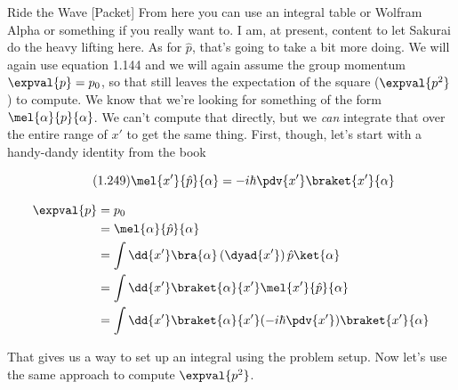 \begin{answer}
\begin{answerpart}{Ride the Wave [Packet]}
    From here you can use an integral table or Wolfram Alpha or
    something if you really want to.  I am, at present, content to let
    Sakurai do the heavy lifting here.  As for $\hat{p}$, that's going
    to take a bit more doing.  We will again use equation 1.144 and we
    will again assume the group momentum $\expval{p} = p_0$, so that
    still leaves the expectation of the square ($\expval{p^2}$) to
    compute.  We know that we're looking for something of the form
    $\mel{\alpha}{p}{\alpha}$.  We can't compute that directly, but we
    \emph{can} integrate that over the entire range of $x'$ to get the
    same thing.  First, though, let's start with a handy-dandy
    identity from the book

    \begin{equation}
      \tag{1.249}
      \mel{x'}{\hat{p}}{\alpha} = -i \hbar \pdv{x'} \braket{x'}{\alpha}
    \end{equation}

    \begin{equation}
      \begin{split}
        \expval{p}
        &= p_0\\
        &= \mel{\alpha}{\hat{p}}{\alpha}\\
        &= \int \dd{x'} \bra{\alpha} \left(\dyad{x'}\right) \hat{p}\ket{\alpha}\\
        &= \int \dd{x'} \braket{\alpha}{x'} \mel{x'}{\hat{p}}{\alpha}\\
        &= \int \dd{x'} \braket{\alpha}{x'} (-i \hbar \pdv{x'})\braket{x'}{\alpha}\\
      \end{split}
    \end{equation}

    That gives us a way to set up an integral using the problem setup.
    Now let's use the same approach to compute $\expval{p^2}$.


\end{answerpart}
\end{answer}
